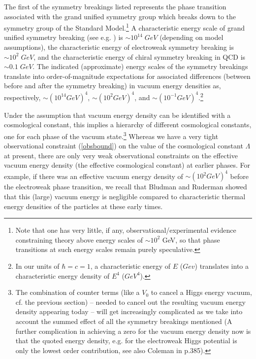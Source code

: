 \documentclass[12pt]{article}
\begin{document}
The first of the symmetry breakings listed represents the phase
transition associated with the grand unified symmetry group which
breaks down to the symmetry group of the Standard
Model.\footnote{Note that one has very little, if any,
observational/experimental evidence constraining theory above
energy scales of $\sim 10^2$ GeV, so that phase transitions at
such energy scales remain purely speculative.} A characteristic
energy scale of grand unified symmetry breaking (see e.g.
\cite{kolb93}) is $\sim 10^{14} \; GeV$ (depending on model
assumptions), the characteristic energy of electroweak symmetry
breaking is $\sim 10^2 \; GeV$, and the characteristic energy of
chiral symmetry breaking in QCD is $\sim 0.1 \; GeV$. The
indicated (approximate) energy scales of the symmetry breakings
translate into order-of-magnitude expectations for associated
differences (between before and after the symmetry breaking) in
vacuum energy densities as, respectively, $\sim (10^{14} GeV)^4$,
$\sim (10^2 GeV)^4$, and $\sim (10^{-1} GeV)^{4}$.\footnote{In our
units of $\hbar = c = 1$, a characteristic energy of $E$ ($Gev$)
translates into a characteristic energy density of $E^4$
($GeV^4$).}

Under the assumption that vacuum energy density can be identified
with a cosmological constant, this implies a hierarchy of different
cosmological constants, one for each phase of the vacuum
state.\footnote{ The combination of counter terms (like a $V_0$ to
cancel a Higgs energy vacuum, cf. the previous section) -- needed to
cancel out the resulting vacuum energy density appearing today --
will get increasingly complicated as we take into account the
summed effect of all the symmetry breakings mentioned (A further
complication in achieving a zero for the vacuum energy density now
is that the quoted energy density, e.g. for the electroweak Higgs
potential is only the lowest order contribution, see also Coleman
in \cite{cao99} p.385). } Whereas we have a very tight
observational constraint (\ref{obsbound}) on the value of the
cosmological constant $\Lambda$ at present, there are only very
weak observational constraints on the effective vacuum energy
density (the effective cosmological constant) at earlier phases.
For example, if there was an effective vacuum energy density of
$\sim (10^2 GeV)^4$ before the electroweak phase transition, we
recall that Bludman and Ruderman \cite{bludman77} showed that this
(large) vacuum energy is negligible compared to characteristic
thermal energy densities of the particles at these early times. 
\end{document}
